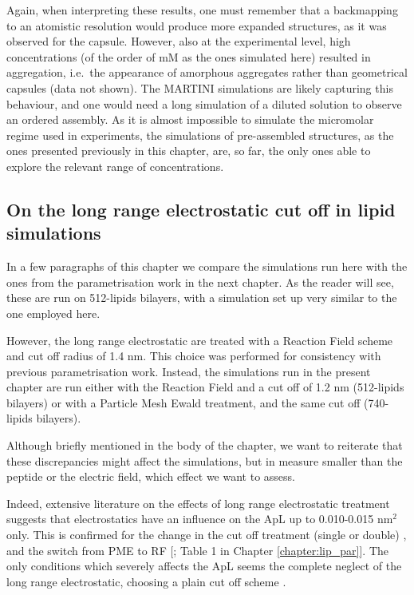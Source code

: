 Again, when interpreting these results, one must remember that a backmapping to an atomistic resolution would produce more expanded structures, as it was observed for the capsule. However, also at the experimental level, high concentrations (of the order of mM as the ones simulated here) resulted in aggregation, i.e.\ the appearance of amorphous aggregates rather than geometrical capsules (data not shown). The MARTINI simulations are likely capturing this behaviour, and one would need a long simulation of a diluted solution to observe an ordered assembly. As it is almost impossible to simulate the micromolar regime used in experiments, the simulations of pre-assembled structures, as the ones presented previously in this chapter, are, so far, the only ones able to explore the relevant range of concentrations.

\subsection{On the long range electrostatic cut off in lipid simulations}
In a few paragraphs of this chapter we compare the simulations run here with the ones from the parametrisation work in the next chapter. As the reader will see, these are run on 512-lipids bilayers, with a simulation set up very similar to the one employed here.

However, the long range electrostatic are treated with a Reaction Field scheme and cut off radius of 1.4 nm. This choice was performed for consistency with previous parametrisation work.
%
Instead, the simulations run in the present chapter are run either with the Reaction Field and a cut off of 1.2 nm (512-lipids bilayers) or with a Particle Mesh Ewald treatment, and the same cut off (740-lipids bilayers).

Although briefly mentioned in the body of the chapter, we want to reiterate that these discrepancies might affect the simulations, but in measure smaller than the peptide or the electric field, which effect we want to assess.

Indeed, extensive literature on the effects of long range electrostatic treatment suggests that electrostatics have an influence on the ApL up to 0.010-0.015 nm$^2$ only. This is confirmed for the change in the cut off treatment (single or double) \citep{Silva2018,Reisser2017}, and the switch from PME to RF [\citet{Poger2012}; Table 1 in Chapter \ref{chapter:lip_par}].
%
The only conditions which severely affects the ApL seems the complete neglect of the long range electrostatic, choosing a plain cut off scheme \citep{Patra2003}.

